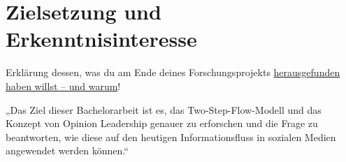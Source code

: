 
\section{Zielsetzung und Erkenntnisinteresse}
\label{sec:zielsetzung-und-erkenntnisinteresse}


Erklärung dessen, was du am Ende deines Forschungsprojekts \href{https://www.scribbr.de/anfang-abschlussarbeit/zielsetzung-formulieren/}{herausgefunden haben willst – und warum}!

„Das Ziel dieser Bachelorarbeit ist es, das Two-Step-Flow-Modell
 und das Konzept von Opinion Leadership genauer zu erforschen und die
Frage zu beantworten, wie diese auf den heutigen Informationsfluss in
sozialen Medien angewendet werden können.“

